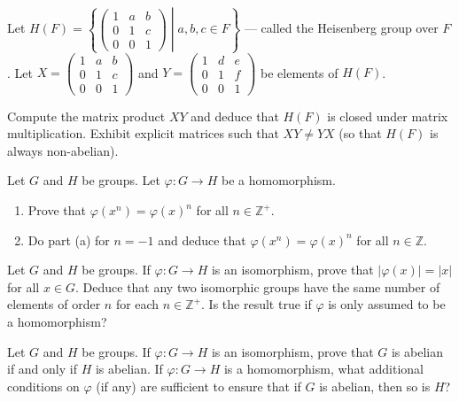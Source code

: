 \begin{questions}
\question
Let \(H(F)=\left\{\left.\left(\begin{array}{lll}1 & a & b \\ 0 & 1 & c \\ 0 & 0 & 1\end{array}\right) \;\right|\; a, b, c \in F\right\}\) --- called the Heisenberg group over \(F\).
Let \(X=\left(\begin{array}{lll}1 & a & b \\ 0 & 1 & c \\ 0 & 0 & 1\end{array}\right)\) and \(Y=\left(\begin{array}{lll}1 & d & e \\ 0 & 1 & f \\ 0 & 0 & 1\end{array}\right)\) be elements of \(H(F)\).

Compute the matrix product \(X Y\) and deduce that \(H(F)\) is closed under matrix multiplication. Exhibit explicit matrices such that \(X Y \neq Y X\) (so that \(H(F)\) is always non-abelian).



\question

Let \(G\) and \(H\) be groups.  Let \(\varphi: {G} \rightarrow {H}\) be a homomorphism.
\begin{enumerate}[label=(\alph*)]
    \item Prove that \(\varphi\left(x^n\right)=\varphi(x)^n\) for all \(n \in \mathbb{Z}^{+}\).
    \item  Do part (a) for \(n=-1\) and deduce that \(\varphi\left(x^n\right)=\varphi(x)^n\) for all \(n \in \mathbb{Z}\).
\end{enumerate}





\question

Let \(G\) and \(H\) be groups. If \(\varphi: G \rightarrow H\) is an isomorphism, prove that \(|\varphi(x)|=|x|\) for all \(x \in G\). Deduce that any two isomorphic groups have the same number of elements of order \(n\) for each \(n \in \mathbb{Z}^{+}\). Is the result true if \(\varphi\) is only assumed to be a homomorphism?

\question
Let \(G\) and \(H\) be groups. If \(\varphi: G \rightarrow H\) is an isomorphism, prove that \(G\) is abelian if and only if \(H\) is abelian. If \(\varphi: G \rightarrow H\) is a homomorphism, what additional conditions on \(\varphi\) (if any) are sufficient to ensure that if \(G\) is abelian, then so is \(H\)?


\end{questions}
